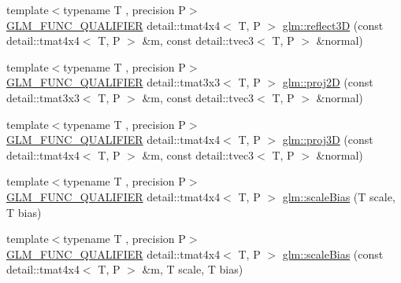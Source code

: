 \begin{DoxyCompactItemize}
\item 
{\footnotesize template$<$typename T , precision P$>$ }\\\hyperlink{setup_8hpp_a33fdea6f91c5f834105f7415e2a64407}{G\+L\+M\+\_\+\+F\+U\+N\+C\+\_\+\+Q\+U\+A\+L\+I\+F\+I\+ER} detail\+::tmat4x4$<$ T, P $>$ \hyperlink{namespaceglm_a1c0b4d42e9d4230035d2ffb1d4296a4a}{glm\+::reflect3D} (const detail\+::tmat4x4$<$ T, P $>$ \&m, const detail\+::tvec3$<$ T, P $>$ \&normal)
\item 
{\footnotesize template$<$typename T , precision P$>$ }\\\hyperlink{setup_8hpp_a33fdea6f91c5f834105f7415e2a64407}{G\+L\+M\+\_\+\+F\+U\+N\+C\+\_\+\+Q\+U\+A\+L\+I\+F\+I\+ER} detail\+::tmat3x3$<$ T, P $>$ \hyperlink{group__gtx__transform2_gad51e1fa33875b966db2f97cb7f21c48a}{glm\+::proj2D} (const detail\+::tmat3x3$<$ T, P $>$ \&m, const detail\+::tvec3$<$ T, P $>$ \&normal)
\item 
{\footnotesize template$<$typename T , precision P$>$ }\\\hyperlink{setup_8hpp_a33fdea6f91c5f834105f7415e2a64407}{G\+L\+M\+\_\+\+F\+U\+N\+C\+\_\+\+Q\+U\+A\+L\+I\+F\+I\+ER} detail\+::tmat4x4$<$ T, P $>$ \hyperlink{group__gtx__transform2_ga70a21b940727b94060fd3826eeacb048}{glm\+::proj3D} (const detail\+::tmat4x4$<$ T, P $>$ \&m, const detail\+::tvec3$<$ T, P $>$ \&normal)
\item 
{\footnotesize template$<$typename T , precision P$>$ }\\\hyperlink{setup_8hpp_a33fdea6f91c5f834105f7415e2a64407}{G\+L\+M\+\_\+\+F\+U\+N\+C\+\_\+\+Q\+U\+A\+L\+I\+F\+I\+ER} detail\+::tmat4x4$<$ T, P $>$ \hyperlink{namespaceglm_a5a113176ab39952ded7ecc6cf745d4d3}{glm\+::scale\+Bias} (T scale, T bias)
\item 
{\footnotesize template$<$typename T , precision P$>$ }\\\hyperlink{setup_8hpp_a33fdea6f91c5f834105f7415e2a64407}{G\+L\+M\+\_\+\+F\+U\+N\+C\+\_\+\+Q\+U\+A\+L\+I\+F\+I\+ER} detail\+::tmat4x4$<$ T, P $>$ \hyperlink{namespaceglm_a8ab0c3b1c92fcaf845bcb6ee9ea1c70e}{glm\+::scale\+Bias} (const detail\+::tmat4x4$<$ T, P $>$ \&m, T scale, T bias)
\end{DoxyCompactItemize}
